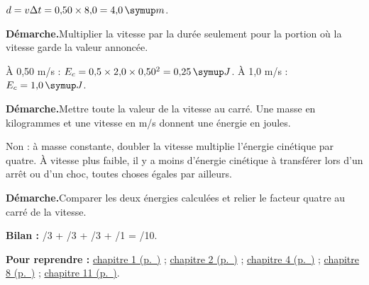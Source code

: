 \par\noindent\begin{minipage}{\linewidth}$d=v\Delta t=0{,}50\times8{,}0=4{,}0\unite m$.\par\smallskip\textbf{Démarche.}\enspace Multiplier la vitesse par la durée seulement pour la portion où la vitesse garde la valeur annoncée.\par{}\end{minipage}\par
\par\noindent\begin{minipage}{\linewidth}À 0,50 m/s : $E_c=0{,}5\times2{,}0\times0{,}50^2=0{,}25\unite J$. À 1,0 m/s : $E_c=1{,}0\unite J$.\par\smallskip\textbf{Démarche.}\enspace Mettre toute la valeur de la vitesse au carré. Une masse en kilogrammes et une vitesse en m/s donnent une énergie en joules.\par{}\end{minipage}\par
\par\noindent\begin{minipage}{\linewidth}Non : à masse constante, doubler la vitesse multiplie l’énergie cinétique par quatre. À vitesse plus faible, il y a moins d’énergie cinétique à transférer lors d’un arrêt ou d’un choc, toutes choses égales par ailleurs.\par\smallskip\textbf{Démarche.}\enspace Comparer les deux énergies calculées et relier le facteur quatre au carré de la vitesse.\par{}\end{minipage}\par
{}
\par\noindent\begin{minipage}{\linewidth}{\small\textbf{Bilan :} /3 + /3 + /3 + /1 = /10.\par\textbf{Pour reprendre :} \hyperref[chap-1]{chapitre 1 (p.~\pageref*{chap-1})} ; \hyperref[chap-2]{chapitre 2 (p.~\pageref*{chap-2})} ; \hyperref[chap-4]{chapitre 4 (p.~\pageref*{chap-4})} ; \hyperref[chap-8]{chapitre 8 (p.~\pageref*{chap-8})} ; \hyperref[chap-11]{chapitre 11 (p.~\pageref*{chap-11})}.\par}\end{minipage}\par
